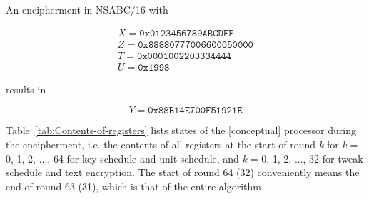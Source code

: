 \documentclass[a4paper,oneside,english]{amsart}
\numberwithin{equation}{section}
\numberwithin{figure}{section}
\begin{document}
An encipherment in NSABC/16 with

\[
\begin{array}{c}
X=\mathtt{0x0123456789ABCDEF}\\
Z=\mathtt{0x88880777006600050000}\\
T=\mathtt{0x0001002203334444}\\
U=\mathtt{0x1998}
\end{array}
\]


results in

\[
Y=\mathtt{0x88B14E700F51921E}
\]


Table~\ref{tab:Contents-of-registers} lists states of the {[}conceptual{]}
processor during the encipherment, i.e. the contents of all registers
at the start of round \emph{k} for \emph{k} = 0, 1, 2, ..., 64 for
key schedule and unit schedule, and \emph{k} = 0, 1, 2, ..., 32 for
tweak schedule and text encryption. The start of round 64 (32) conveniently
means the end of round 63 (31), which is that of the entire algorithm.
\end{document}
